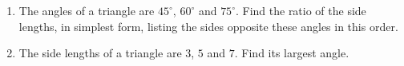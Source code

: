 \begin{enumerate}
\item[(a)] The angles of a triangle are $45^\circ$, $60^\circ$ and $75^\circ$. Find the ratio of the side lengths, in simplest form, listing the sides opposite these angles in this order.
\item[(b)] The side lengths of a triangle are $3$, $5$ and $7$. Find its largest angle.
\end{enumerate}

